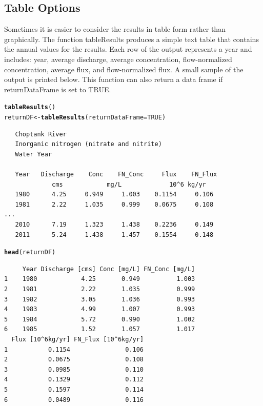 \documentclass[a4paper,11pt]{article}\usepackage[]{graphicx}\usepackage[]{color}
\makeatletter
\newcommand{\hlnum}[1]{\textcolor[rgb]{0.686,0.059,0.569}{#1}}%
\newcommand{\hlstd}[1]{\textcolor[rgb]{0.345,0.345,0.345}{#1}}%
\newcommand{\hlkwb}[1]{\textcolor[rgb]{0.69,0.353,0.396}{#1}}%
\newcommand{\hlkwc}[1]{\textcolor[rgb]{0.333,0.667,0.333}{#1}}%
\newcommand{\hlkwd}[1]{\textcolor[rgb]{0.737,0.353,0.396}{\textbf{#1}}}%
\newenvironment{kframe}{%
 \def\at@end@of@kframe{}%
 \ifinner\ifhmode%
  \def\at@end@of@kframe{\end{minipage}}%
  \begin{minipage}{\columnwidth}%
 \fi\fi%
 \def\FrameCommand##1{\hskip\@totalleftmargin \hskip-\fboxsep
 \colorbox{shadecolor}{##1}\hskip-\fboxsep
     \hskip-\linewidth \hskip-\@totalleftmargin \hskip\columnwidth}%
 \MakeFramed {\advance\hsize-\width
   \@totalleftmargin\z@ \linewidth\hsize
   \@setminipage}}%
 {\par\unskip\endMakeFramed%
 \at@end@of@kframe}
\newenvironment{knitrout}{}{} %
\makeatother
\begin{document}
\FloatBarrier
\subsection{Table Options}
\label{sec:wrtdsTable}
Sometimes it is easier to consider the results in table form rather than graphically. The function tableResults produces a simple text table that contains the annual values for the results.  Each row of the output represents a year and includes: year, average discharge, average concentration, flow-normalized concentration, average flux, and flow-normalized flux.  A small sample of the output is printed below. This function can also return a data frame if returnDataFrame is set to TRUE.

\begin{knitrout}
\color{fgcolor}\begin{kframe}
\begin{alltt}
\hlkwd{tableResults}\hlstd{()}
\hlstd{returnDF} \hlkwb{<-} \hlkwd{tableResults}\hlstd{(}\hlkwc{returnDataFrame}\hlstd{=}\hlnum{TRUE}\hlstd{)}
\end{alltt}
\end{kframe}
\end{knitrout}


\begin{verbatim}
   Choptank River 
   Inorganic nitrogen (nitrate and nitrite)
   Water Year 

   Year   Discharge    Conc    FN_Conc     Flux    FN_Flux
             cms            mg/L             10^6 kg/yr 
   1980      4.25     0.949     1.003    0.1154     0.106
   1981      2.22     1.035     0.999    0.0675     0.108
...
   2010      7.19     1.323     1.438    0.2236     0.149
   2011      5.24     1.438     1.457    0.1554     0.148
\end{verbatim}




\begin{knitrout}
\color{fgcolor}\begin{kframe}
\begin{alltt}
\hlkwd{head}\hlstd{(returnDF)}
\end{alltt}
\begin{verbatim}
     Year Discharge [cms] Conc [mg/L] FN_Conc [mg/L]
1    1980            4.25       0.949          1.003
2    1981            2.22       1.035          0.999
3    1982            3.05       1.036          0.993
4    1983            4.99       1.007          0.993
5    1984            5.72       0.990          1.002
6    1985            1.52       1.057          1.017
  Flux [10^6kg/yr] FN_Flux [10^6kg/yr]
1           0.1154               0.106
2           0.0675               0.108
3           0.0985               0.110
4           0.1329               0.112
5           0.1597               0.114
6           0.0489               0.116
\end{verbatim}
\end{kframe}
\end{knitrout}
\end{document}

